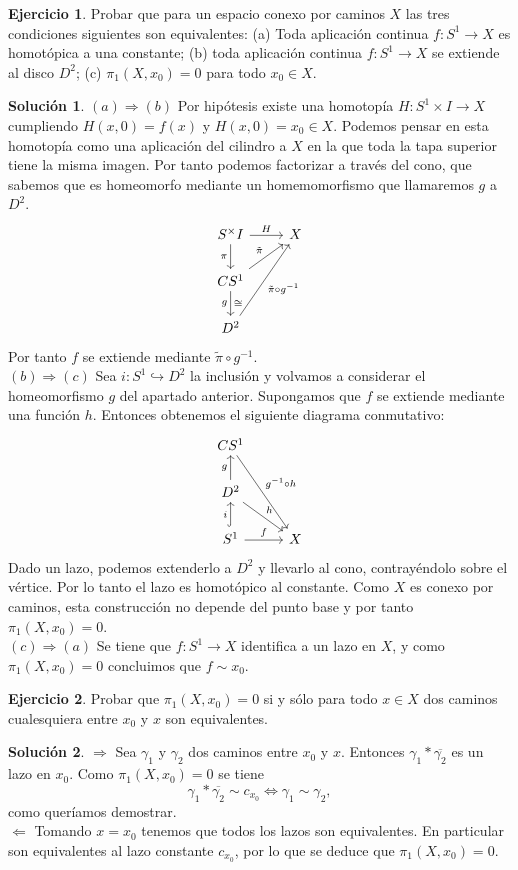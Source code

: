 \documentclass{article}
\theoremstyle{plain}
\theoremstyle{definition}
\newtheorem{exercise}{Ejercicio}
\newtheorem*{sol*}{Solución}
\begin{document}
\newpage \begin{exercise} Probar que para un espacio conexo por caminos $X$ las tres condiciones siguientes son equivalentes:
(a) Toda aplicaci\'on continua $f: S^1\to X$ es homot\'opica a una constante; (b) toda aplicaci\'on continua $f: S ^1 \to X$ se extiende al disco $D^2$;
(c) $\pi_1(X,x_0) = 0$ para todo $x_0\in X$.
\end{exercise}
\begin{sol*}
$\boxed{(a)\Rightarrow(b)}$ Por hipótesis existe una homotopía $H:S^1\times I\to X$ cumpliendo $H(x,0)=f(x)$ y $H(x,0)=x_0\in X$. Podemos pensar en esta homotopía como una aplicación del cilindro a $X$ en la que toda la tapa superior tiene la misma imagen. Por tanto podemos factorizar a través del cono, que sabemos que es homeomorfo mediante un homemomorfismo que llamaremos $g$ a $D^2$.
\[
\begin{tikzcd}
S^\times I\arrow[r,"H"]\arrow[d,"\pi"']& X\\
CS^1\arrow[ur,"\tilde{\pi}"]\arrow[d,"g"',"\cong"]\\
D^2\arrow[uur,"\tilde{\pi}\circ g^{-1}"']
\end{tikzcd}
\]
Por tanto $f$ se extiende mediante $\tilde{\pi}\circ g^{-1}$.\\
$\boxed{(b)\Rightarrow(c)}$ Sea $i:S^1\hookrightarrow D^2$ la inclusión y volvamos a considerar el homeomorfismo $g$ del apartado anterior. Supongamos que $f$ se extiende mediante una función $h$. Entonces obtenemos el siguiente diagrama conmutativo:
\[
\begin{tikzcd}
CS^1\arrow[ddr,"g^{-1}\circ h"]\\
D^2\arrow[u,"g"]\arrow[dr,"h"]\\
S^1\arrow[u,"i",hookrightarrow]\arrow[r,"f"]& X
\end{tikzcd}
\]
Dado un lazo, podemos extenderlo a $D^2$ y llevarlo al cono, contrayéndolo sobre el vértice. Por lo tanto el lazo es homotópico al constante. Como $X$ es conexo por caminos, esta construcción no depende del punto base y por tanto $\pi_1(X,x_0)=0$.\\
$\boxed{(c)\Rightarrow(a)}$ Se tiene que $f:S^1\to X$ identifica a un lazo en $X$, y como $\pi_1(X,x_0)=0$ concluimos que $f\sim x_0$.
\end{sol*}
\newpage 

\begin{exercise}
Probar que $\pi_1(X,x_0) = 0$ si y s\'olo para todo $x\in X$ dos caminos cualesquiera entre $x_0$ y $x$ son equivalentes.
\end{exercise}
\newpage 
\begin{sol*}
$\boxed{\Rightarrow}$ Sea $\gamma_1$ y $\gamma_2$ dos caminos entre $x_0$ y $x$. Entonces $\gamma_1*\overline{\gamma_2}$ es un lazo en $x_0$. Como $\pi_1(X,x_0)=0$ se tiene
\[
\gamma_1*\overline{\gamma_2}\sim c_{x_0}\Leftrightarrow \gamma_1\sim\gamma_2,
\]
como queríamos demostrar.\\
$\boxed{\Leftarrow}$ Tomando $x=x_0$ tenemos que todos los lazos son equivalentes. En particular son equivalentes al lazo constante $c_{x_0}$, por lo que se deduce que $\pi_1(X,x_0)=0$.
\end{sol*}
\end{document}
